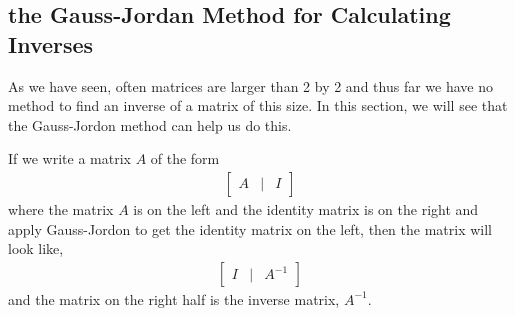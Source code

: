 \subsection{the Gauss-Jordan Method for Calculating Inverses}

As we have seen, often matrices are larger than 2 by 2 and thus far we have no method to find an inverse of a matrix of this size.  In this section, we will see that the Gauss-Jordon method can help us do this.  


If we write a matrix $A$ of the form
%
\begin{align*}
\begin{bmatrix}
A & | & I
\end{bmatrix}
\end{align*}
where the matrix $A$ is on the left and the identity matrix is on the right and apply Gauss-Jordon to get the identity matrix on the left, then the matrix will look like, 
%
\begin{align*}
\begin{bmatrix}
I & | & A^{-1}
\end{bmatrix}
\end{align*}
and the matrix on the right half is the inverse matrix, $A^{-1}$. 

